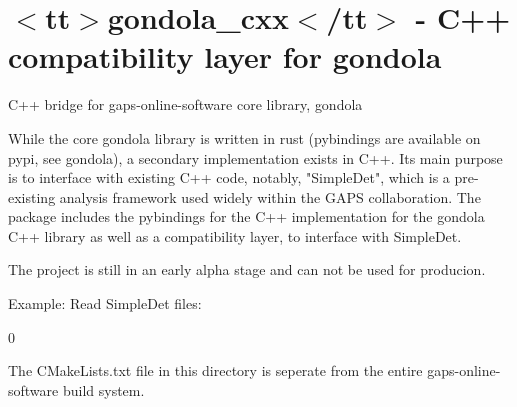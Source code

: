 \chapter{\texorpdfstring{$<$}{<}tt\texorpdfstring{$>$}{>}gondola\+\_\+cxx\texorpdfstring{$<$}{<}/tt\texorpdfstring{$>$}{>} -\/ C++ compatibility layer for gondola}
\hypertarget{md__2home_2runner_2work_2gaps-online-software_2gaps-online-software_2gondola-core_2C_09_09_2README}{}\label{md__2home_2runner_2work_2gaps-online-software_2gaps-online-software_2gondola-core_2C_09_09_2README}
\label{md__2home_2runner_2work_2gaps-online-software_2gaps-online-software_2gondola-core_2C_09_09_2README_autotoc_md4}%
%
 C++ bridge for {\ttfamily gaps-\/online-\/software} core library, {\ttfamily gondola}

While the core {\ttfamily gondola} library is written in rust (pybindings are available on pypi, see {\ttfamily gondola}), a secondary implementation exists in C++. It\textquotesingle{}s main purpose is to interface with existing C++ code, notably, "{}\+Simple\+Det"{}, which is a pre-\/existing analysis framework used widely within the GAPS collaboration. The {\ttfamily {}} package includes the pybindings for the C++ implementation for the gondola C++ library as well as a compatibility layer, to interface with Simple\+Det.

The project is still in an early alpha stage and can not be used for producion.

Example\+: Read Simple\+Det files\+:


\begin{DoxyCode}{0}
\DoxyCodeLine{}
\DoxyCodeLine{}

\end{DoxyCode}


The CMake\+Lists.\+txt file in this directory is seperate from the entire gaps-\/online-\/software build system. 